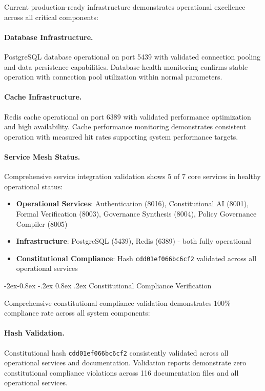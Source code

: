 \documentclass[manuscript,screen,9pt]{acmart}
\makeatletter
\renewcommand\subsubsection{\@startsection{subsubsection}{3}{\z@}%
  {-2ex\@plus -0.8ex \@minus -.2ex}%
  {0.8ex \@plus .2ex}%
  {\normalfont\normalsize\bfseries}}
\makeatother
\begin{document}
\begin{table}[!htb]
Current production-ready infrastructure demonstrates operational excellence across all critical components:

\paragraph{Database Infrastructure.} PostgreSQL database operational on port 5439 with validated connection pooling and data persistence capabilities. Database health monitoring confirms stable operation with connection pool utilization within normal parameters.

\paragraph{Cache Infrastructure.} Redis cache operational on port 6389 with validated performance optimization and high availability. Cache performance monitoring demonstrates consistent operation with measured hit rates supporting system performance targets.

\paragraph{Service Mesh Status.} Comprehensive service integration validation shows 5 of 7 core services in healthy operational status:
\begin{itemize}[leftmargin=*,itemsep=1pt,parsep=1pt]
    \item \textbf{Operational Services}: Authentication (8016), Constitutional AI (8001), Formal Verification (8003), Governance Synthesis (8004), Policy Governance Compiler (8005)
    \item \textbf{Infrastructure}: PostgreSQL (5439), Redis (6389) - both fully operational
    \item \textbf{Constitutional Compliance}: Hash \texttt{cdd01ef066bc6cf2} validated across all operational services
\end{itemize}

\subsubsection{Constitutional Compliance Verification}
\label{subsubsec:constitutional_compliance_verification}

Comprehensive constitutional compliance validation demonstrates 100\% compliance rate across all system components:

\paragraph{Hash Validation.} Constitutional hash \texttt{cdd01ef066bc6cf2} consistently validated across all operational services and documentation. Validation reports demonstrate zero constitutional compliance violations across 116 documentation files and all operational services.


\end{table}
\end{document}
